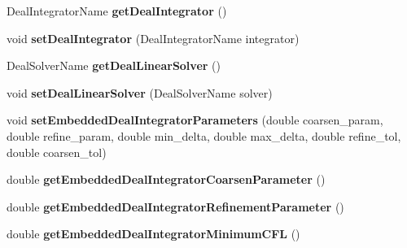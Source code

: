 \begin{DoxyCompactItemize}
\item 
\hypertarget{classnatrium_1_1SolverConfiguration_a5ba156b86d81572776d8c20b04f21dcc}{
DealIntegratorName {\bfseries getDealIntegrator} ()}
\label{classnatrium_1_1SolverConfiguration_a5ba156b86d81572776d8c20b04f21dcc}

\item 
\hypertarget{classnatrium_1_1SolverConfiguration_acf54eacaa0135343d69a31f0bbc8031c}{
void {\bfseries setDealIntegrator} (DealIntegratorName integrator)}
\label{classnatrium_1_1SolverConfiguration_acf54eacaa0135343d69a31f0bbc8031c}

\item 
\hypertarget{classnatrium_1_1SolverConfiguration_a0678dd0f89508e37c5c555413d5dc258}{
DealSolverName {\bfseries getDealLinearSolver} ()}
\label{classnatrium_1_1SolverConfiguration_a0678dd0f89508e37c5c555413d5dc258}

\item 
\hypertarget{classnatrium_1_1SolverConfiguration_a63ab4a5ff44381dfff6558c030fa3665}{
void {\bfseries setDealLinearSolver} (DealSolverName solver)}
\label{classnatrium_1_1SolverConfiguration_a63ab4a5ff44381dfff6558c030fa3665}

\item 
\hypertarget{classnatrium_1_1SolverConfiguration_a7a017f7078ef42c350efbfca51d9681c}{
void {\bfseries setEmbeddedDealIntegratorParameters} (double coarsen\_\-param, double refine\_\-param, double min\_\-delta, double max\_\-delta, double refine\_\-tol, double coarsen\_\-tol)}
\label{classnatrium_1_1SolverConfiguration_a7a017f7078ef42c350efbfca51d9681c}

\item 
\hypertarget{classnatrium_1_1SolverConfiguration_a0e233c5ac8c6387bf31923700fd95b56}{
double {\bfseries getEmbeddedDealIntegratorCoarsenParameter} ()}
\label{classnatrium_1_1SolverConfiguration_a0e233c5ac8c6387bf31923700fd95b56}

\item 
\hypertarget{classnatrium_1_1SolverConfiguration_a9f8fda7b80e405dab21388cdb0eacbbe}{
double {\bfseries getEmbeddedDealIntegratorRefinementParameter} ()}
\label{classnatrium_1_1SolverConfiguration_a9f8fda7b80e405dab21388cdb0eacbbe}

\item 
\hypertarget{classnatrium_1_1SolverConfiguration_a6c15ce0e57ef59f292907e779f7e371a}{
double {\bfseries getEmbeddedDealIntegratorMinimumCFL} ()}
\label{classnatrium_1_1SolverConfiguration_a6c15ce0e57ef59f292907e779f7e371a}


\end{DoxyCompactItemize}
